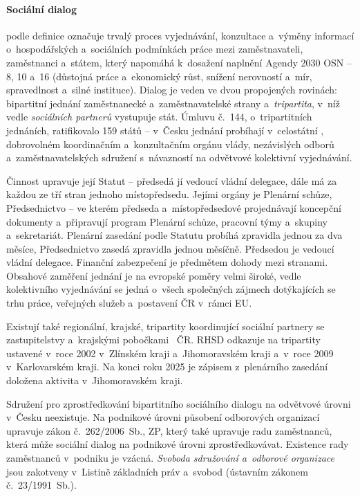 

\paragraph{Sociální dialog} podle definice  označuje trvalý proces vyjednávání, konzultace a~výměny informací o~hospodářských a~sociálních podmínkách práce mezi zaměstnavateli, zaměstnanci a~státem, který napomáhá k~dosažení naplnění Agendy 2030 \ac{OSN} --  8, 10 a~16 (důstojná práce a~ekonomický růst, snížení nerovností a~mír, spravedlnost a~silné instituce). Dialog je veden ve dvou propojených rovinách: bipartitní jednání zaměstnanecké a~zaměstnavatelské strany a~\textit{tripartita}, v~níž vedle \textit{sociálních partnerů} vystupuje stát. Úmluvu č.~144, o~tripartitních jednáních, ratifikovalo 159 států -- v~Česku jednání probíhají v~celostátní , dobrovolném koordinačním a~konzultačním orgánu vlády, nezávislých odborů a~zaměstnavatelských sdružení s~návazností na odvětvové kolektivní vyjednávání.\par
Činnost  upravuje její Statut -- předsedá jí vedoucí vládní delegace, dále má za každou ze tří stran jednoho místopředsedu. Jejími orgány je Plenární schůze, Předsednictvo -- ve kterém předseda a~místopředsedové projednávají koncepční dokumenty a~připravují program Plenární schůze, pracovní týmy a~skupiny a~sekretariát. Plenární zasedání podle Statutu  probíhá zpravidla jednou za dva měsíce, Předsednictvo zasedá zpravidla jednou měsíčně. Předsedou  je vedoucí vládní delegace. Finanční zabezpečení je předmětem dohody mezi stranami. Obsahové zaměření jednání  je na evropské poměry velmi široké, vedle kolektivního vyjednávání se jedná o~všech společných zájmech dotýkajících se trhu práce, veřejných služeb a~postavení \acs{ČR} v~rámci \acs{EU}.\par
Existují také regionální, krajské, tripartity koordinující sociální partnery se zastupitelstvy a~krajskými pobočkami ~\acs{ČR}. \Ac{RHSD} odkazuje na tripartity ustavené v~roce 2002 v~Zlínském kraji a~Jihomoravském kraji a~v~roce 2009 v~Karlovarském kraji. Na konci roku 2025 je zápisem z~plenárního zasedání doložena aktivita v~Jihomoravském kraji.\par

Sdružení pro zprostředkování bipartitního sociálního dialogu na odvětvové úrovni v~Česku neexistuje. Na podnikové úrovni působení odborových organizací upravuje zákon č.~262/2006~Sb., \ac{ZP}, který také upravuje radu zaměstnanců, která může sociální dialog na podnikové úrovni zprostředkovávat. Existence rady zaměstnanců v~podniku je vzácná. \textit{Svoboda sdružování a~odborové organizace} jsou zakotveny v~Listině základních práv a~svobod (ústavním zákonem č.~23/1991~Sb.).~\cite{ILO_SocialDialogue}~\cite{RHSD_CR}~\cite{RHSD_JMK}~\cite{Eurofound_CZ_Actors2024}\par

